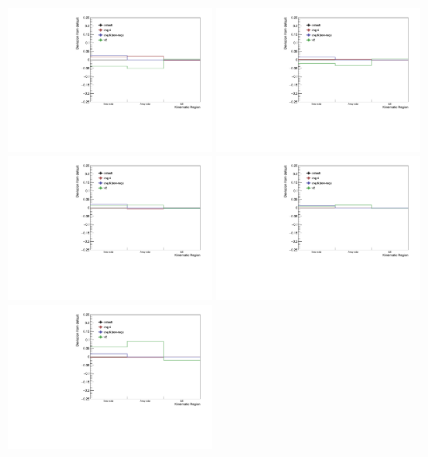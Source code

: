 \begin{figure}[ht]
    \centering
    \includegraphics[width=0.48\textwidth]{figures/analysis/h_h_0_20_lowpt_yield_variation.pdf}
    \includegraphics[width=0.48\textwidth]{figures/analysis/h_h_0_20_highpt_yield_variation.pdf}
    \includegraphics[width=0.48\textwidth]{figures/analysis/h_h_20_50_lowpt_yield_variation.pdf}
    \includegraphics[width=0.48\textwidth]{figures/analysis/h_h_20_50_highpt_yield_variation.pdf}
    \includegraphics[width=0.48\textwidth]{figures/analysis/h_h_50_80_lowpt_yield_variation.pdf}

\end{figure}
